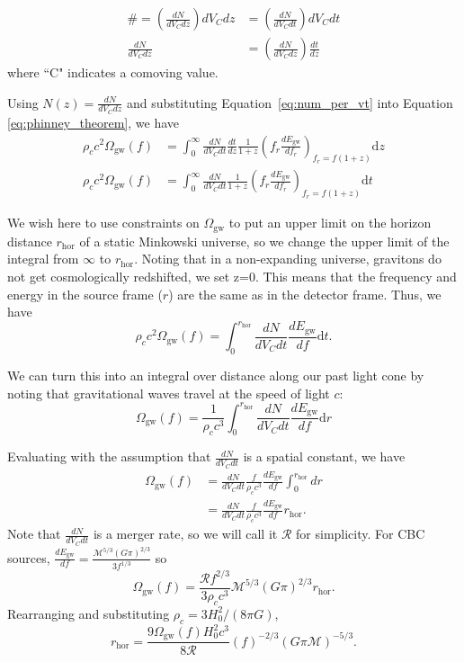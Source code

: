 \documentclass[]{article}
\newcommand{\Ogw}{\Omega_{\mathrm{gw}}}
\newcommand{\rhor}{r_{\text{hor}}}
\begin{document}
\begin{align}
\# = (\frac{dN}{dV_C dz}) dV_C dz  &= (\frac{dN}{dV_C dt}) dV_C dt \nonumber \\
\frac{dN}{dV_C dz} &= (\frac{dN}{dV_C dz}) \frac{dt}{dz}
\label{eq:num_per_vt}
\end{align} 
where ``C" indicates a comoving value.

Using $N(z) = \frac{dN}{dV_C dz}$ and substituting Equation~\ref{eq:num_per_vt} into Equation \ref{eq:phinney_theorem}, we have
\begin{align*}
\rho_c c^2 \Ogw(f) &=  \int_{0}^{\infty} \frac{dN}{dV_C dt} \frac{dt}{dz} \frac{1}{1+z} (f_r \frac{dE_{\mathrm{gw}}}{df_r})_{f_r = f(1+z)} \mathrm{d}z \\
\rho_c c^2 \Ogw(f) &=  \int_{0}^{\infty}\frac{dN}{dV_C dt} \frac{1}{1+z} (f_r \frac{dE_{\mathrm{gw}}}{df_r})_{f_r = f(1+z)} \mathrm{d}t 
\end{align*}

We wish here to use constraints on $\Ogw$ to put an upper limit on the horizon distance $\rhor$ of a static Minkowski universe, so we change the upper limit of the integral from $\infty$ to $\rhor$. 
Noting that in a non-expanding universe, gravitons do not get cosmologically redshifted, we set z=0. 
This means that the frequency and energy in the source frame ($r$) are the same as in the detector frame.
Thus, we have 
\begin{equation*}
	\rho_c c^2 \Ogw(f) =  \int_{0}^{\rhor} \frac{dN}{dV_C dt} \frac{dE_{\mathrm{gw}}}{df} \mathrm{d}t .
\end{equation*}

We can turn this into an integral over distance along our past light cone by noting that gravitational waves travel at the speed of light $c$:
\begin{equation}
	\Ogw(f) =  \frac{1}{\rho_c c^3} \int_{0}^{\rhor} \frac{dN}{dV_C dt} \frac{dE_{\mathrm{gw}}}{df} \mathrm{d}r
	\label{eq:euclid_omega}
\end{equation}

Evaluating with the assumption that $\frac{dN}{dV_C dt}$ is a spatial constant, we have
\begin{align*}
	\Ogw(f) &= \frac{dN}{dV_C dt} \frac{f}{\rho_c c^3} \frac{dE_{\mathrm{gw}}}{df} \int_{0}^{\rhor} dr \\
	&= \frac{dN}{dV_C dt} \frac{f}{\rho_c c^3} \frac{dE_{\mathrm{gw}}}{df} \rhor  .
\end{align*}
Note that $\frac{dN}{dV_C dt}$ is a merger rate, so we will call it $\mathcal{R}$ for simplicity. 
For CBC sources, $\frac{dE_{\mathrm{gw}}}{df} = \frac{\mathcal{M}^{5/3}(G\pi)^{2/3}}{3 f^{1/3}}$ so
\begin{equation*}
	\Ogw(f) = \frac{\mathcal{R} f^{2/3}}{3 \rho_c c^3} \mathcal{M}^{5/3}(G\pi)^{2/3} r_{\text{hor}} .
\end{equation*}
Rearranging and substituting $\rho_c = 3 H_0^2/(8\pi G)$,
\begin{equation*}
	r_{\text{hor}} = \frac{9\Ogw(f) H_0^2 c^3}{8 \mathcal{R}} (f)^{-2/3} ( G \pi \mathcal{M})^{-5/3} .
\end{equation*}
\end{document}
